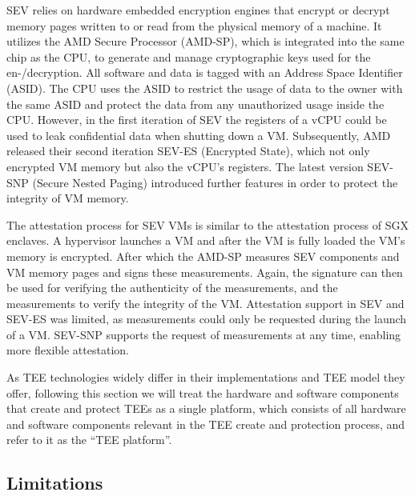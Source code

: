\begin{description}
    SEV relies on hardware embedded encryption engines that encrypt or decrypt
    memory pages written to or read from the physical memory of a machine. It
    utilizes the AMD Secure Processor (AMD-SP), which is integrated into the
    same chip as the CPU, to generate and manage cryptographic keys used for the
    en-/decryption. All software and data is tagged with an Address Space
    Identifier (ASID). The CPU uses the ASID to restrict the usage of data to
    the owner with the same ASID and protect the data from any unauthorized
    usage inside the CPU. However, in the first iteration of SEV the registers
    of a vCPU could be used to leak confidential data when shutting down a VM.
    Subsequently, AMD released their second iteration SEV-ES (Encrypted State),
    which not only encrypted VM memory but also the vCPU's registers. The latest
    version SEV-SNP (Secure Nested Paging) introduced further features in order
    to protect the integrity of VM memory.

    The attestation process for SEV VMs is similar to the attestation process of
    SGX enclaves. A hypervisor launches a VM and after the VM is fully loaded
    the VM's memory is encrypted. After which the AMD-SP measures SEV components
    and VM memory pages and signs these measurements. Again, the signature can
    then be used for verifying the authenticity of the measurements, and the
    measurements to verify the integrity of the VM. Attestation support in SEV
    and SEV-ES was limited, as measurements could only be requested during the
    launch of a VM. SEV-SNP supports the request of measurements at any time,
    enabling more flexible attestation.
\end{description}

As TEE technologies widely differ in their implementations and TEE model they
offer, following this section we will treat the hardware and software components
that create and protect TEEs as a single platform, which consists of all
hardware and software components relevant in the TEE create and protection
process, and refer to it as the ``TEE platform''.

\subsection{Limitations}
\label{sec:limitations}

